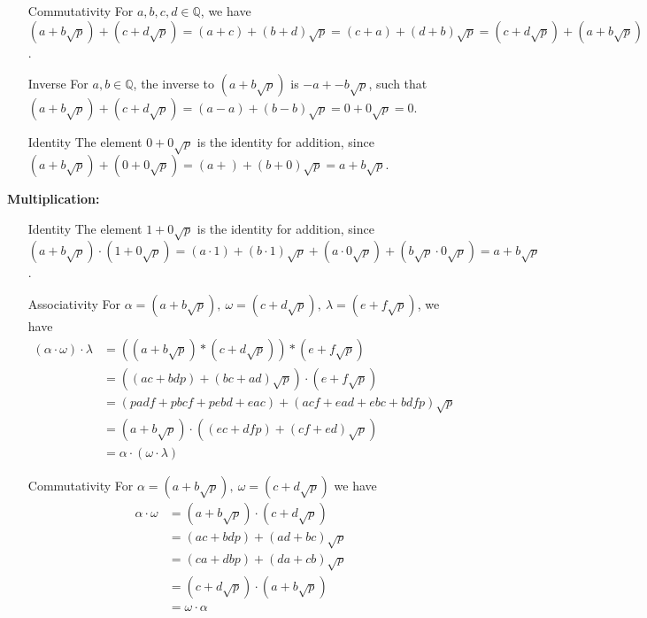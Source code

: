 \documentclass[letterpaper]{article}
\newcommand{\Rationals}{\mathbb{Q}}
\begin{document}
\begin{itemize}
\begin{itemize}
                  \item[Commutativity]  For \(a,b,c,d \in \Rationals\), we have \((a + b\sqrt{p}) + (c + d\sqrt{p}) = (a+c) + (b+d)\sqrt{p} = (c + a) + (d + b)\sqrt{p} = (c + d\sqrt{p}) + (a + b\sqrt{p}) \).
                  \item[Inverse] For \(a, b \in \Rationals\), the inverse to \((a + b\sqrt{p})\) is  \(-a + -b\sqrt{p}\), such that \((a + b\sqrt{p}) + (c + d\sqrt{p}) = (a - a) + (b-b)\sqrt{p} = 0 + 0\sqrt{p} = 0\).
                  \item[Identity] The element \(0 + 0\sqrt{p}\) is the identity for addition, since \((a + b\sqrt{p}) + (0 + 0\sqrt{p})= (a +) + (b + 0)\sqrt{p} = a + b\sqrt{p}\).
            \end{itemize}
            \textbf{Multiplication:}
            \begin{itemize}
                  \item[Identity] The element \(1 + 0\sqrt{p}\) is the identity for addition, since \((a + b\sqrt{p}) \cdot (1 + 0\sqrt{p})= (a \cdot 1) + (b \cdot 1)\sqrt{p} + (a \cdot 0\sqrt{p}) + (b\sqrt{p} \cdot 0\sqrt{p}) = a + b\sqrt{p}\).

                  \item[Associativity] For \(\alpha = (a + b\sqrt{p}),\ \omega = (c + d\sqrt{p}),\ \lambda = (e + f\sqrt{p})\), we have
                        \begin{align*}
                              (\alpha \cdot \omega) \cdot \lambda & = ((a + b\sqrt{p}) * (c + d\sqrt{p})) * (e + f\sqrt{p}) \\&=((a c +  b d p ) + (b c + a d) \sqrt{p}) \cdot (e + f\sqrt{p})
                              \\ & = (padf + pbcf + pebd + eac) +  (a c f + e a d + e b c + b d f p) \sqrt{p}
                              \\ &= (a + b\sqrt{p}) \cdot ((e c + d f p) + (c f + e d)\sqrt{p})
                              \\ &= \alpha \cdot (\omega \cdot \lambda)
                        \end{align*}

                  \item[Commutativity] For \(\alpha = (a + b\sqrt{p}),\ \omega = (c + d\sqrt{p})\) we have
                        \begin{align*}
                              \alpha \cdot \omega & = (a + b\sqrt{p}) \cdot (c + d\sqrt{p}) \\& =
                              (a c + b d p) + (a d + b c)\sqrt{p}
                              \\& = (ca + dbp) + (da + cb)\sqrt{p}
                              \\& = (c + d\sqrt{p}) \cdot (a + b\sqrt{p})
                              \\ &= \omega \cdot \alpha
                        \end{align*}


\end{itemize}
\end{itemize}
\end{document}
